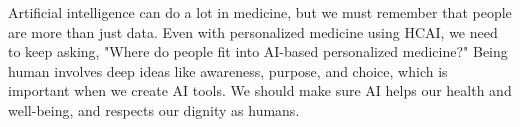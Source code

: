 \documentclass[paper=a4, fontsize=11pt]{scrartcl} %
\numberwithin{equation}{section} %
\numberwithin{figure}{section} %
\numberwithin{table}{section} %
\begin{document}
Artificial intelligence can do a lot in medicine, but we must remember that people are more than just data. 
Even with personalized medicine using HCAI, we need to keep asking, "Where do people fit into AI-based personalized medicine?" 
Being human involves deep ideas like awareness, purpose, and choice, which is important when we create AI tools. 
We should make sure AI helps our health and well-being, and respects our dignity as humans.






























\end{document}
